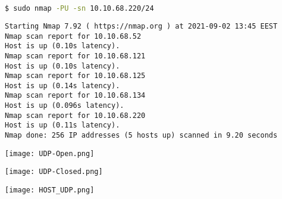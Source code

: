 \documentclass[11pt]{article}
\newenvironment{commandbox}[1][]{
    \begin{tcolorbox}[
        colback=kalibackground,
        colframe=commandcolor,
        fonttitle=\bfseries\color{white},
        title=#1,
        breakable=true
    ]
}{
    \end{tcolorbox}
}
\begin{document}
\begin{commandbox}[UDP Scan (-PU)]
\begin{lstlisting}[language=bash, style=bash, basicstyle=\small\ttfamily\color{warningcolor}]
$ sudo nmap -PU -sn 10.10.68.220/24
\end{lstlisting}

\begin{lstlisting}[basicstyle=\small\ttfamily\color{kalitext}]
Starting Nmap 7.92 ( https://nmap.org ) at 2021-09-02 13:45 EEST
Nmap scan report for 10.10.68.52
Host is up (0.10s latency).
Nmap scan report for 10.10.68.121
Host is up (0.10s latency).
Nmap scan report for 10.10.68.125
Host is up (0.14s latency).
Nmap scan report for 10.10.68.134
Host is up (0.096s latency).
Nmap scan report for 10.10.68.220
Host is up (0.11s latency).
Nmap done: 256 IP addresses (5 hosts up) scanned in 9.20 seconds
\end{lstlisting}
\end{commandbox}
\begin{center}
    \texttt{[image: UDP-Open.png]}
    \end{center}
    \begin{center}
        \texttt{[image: UDP-Closed.png]}
        \end{center}
        \begin{center}
            \texttt{[image: HOST\_UDP.png]}
            \end{center}
\end{document}
